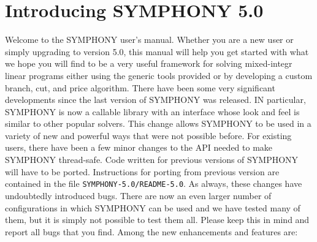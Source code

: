 \section{Introducing SYMPHONY 5.0}
\label{whats-new}

Welcome to the SYMPHONY user's manual. Whether you are a new user or simply
upgrading to version 5.0, this manual will help you get started with what we
hope you will find to be a very useful framework for solving mixed-integr
linear programs either using the generic tools provided or by developing a
custom branch, cut, and price algorithm. There have been some very significant
developments since the last version of SYMPHONY was released. IN particular,
SYMPHONY is now a callable library with an interface whose look and feel is
similar to other popular solvers. This change allows SYMPHONY to be used in a
variety of new and powerful ways that were not possible before. For existing
users, there have been a few minor changes to the API needed to make SYMPHONY
thread-safe. Code written for previous versions of SYMPHONY will have to be
ported. Instructions for porting from previous version are contained in the
file \texttt{SYMPHONY-5.0/README-5.0}. As always, these changes have
undoubtedly introduced bugs. There are now an even larger number of
configurations in which SYMPHONY can be used and we have tested many of them,
but it is simply not possible to test them all. Please keep this in mind and
report all bugs that you find. Among the new enhancements and features are:

